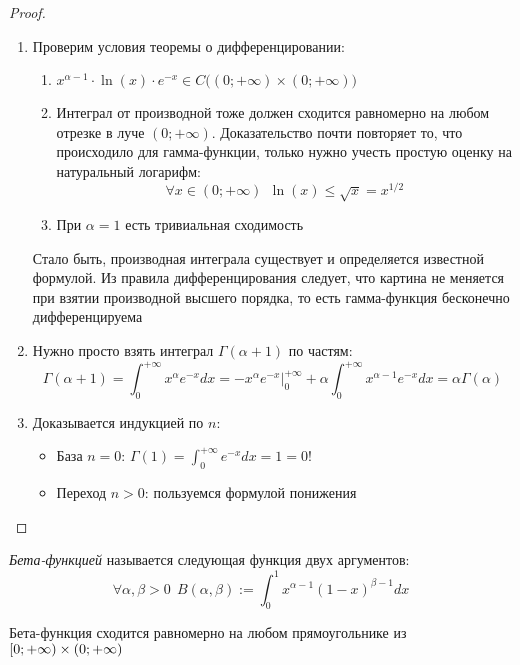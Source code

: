 \begin{proof}~
	\begin{enumerate}
		\item Проверим условия теоремы о дифференцировании:
		\begin{enumerate}
			\item $x^{\alpha - 1} \cdot \ln(x) \cdot e^{-x} \in C\big((0; +\infty) \times (0; +\infty)\big)$
			
			\item Интеграл от производной тоже должен сходится равномерно на любом отрезке в луче $(0; +\infty)$. Доказательство почти повторяет то, что происходило для гамма-функции, только нужно учесть простую оценку на натуральный логарифм:
			\[
				\forall x \in (0; +\infty)\ \ \ln(x) \le \sqrt{x} = x^{1 / 2}
			\]
			
			\item При $\alpha = 1$ есть тривиальная сходимость
		\end{enumerate}
		Стало быть, производная интеграла существует и определяется известной формулой. Из правила дифференцирования следует, что картина не меняется при взятии производной высшего порядка, то есть гамма-функция бесконечно дифференцируема
		
		\item Нужно просто взять интеграл $\Gamma(\alpha + 1)$ по частям:
		\[
			\Gamma(\alpha + 1) = \int_0^{+\infty} x^\alpha e^{-x}dx = -x^\alpha e^{-x}\Big|_0^{+\infty} + \alpha \int_0^{+\infty} x^{\alpha - 1}e^{-x}dx = \alpha\Gamma(\alpha)
		\]
		
		\item Доказывается индукцией по $n$:
		\begin{itemize}
			\item База $n = 0$: $\Gamma(1) = \int_0^{+\infty} e^{-x}dx = 1 = 0!$
			
			\item Переход $n > 0$: пользуемся формулой понижения
		\end{itemize}
	\end{enumerate}
\end{proof}

\begin{definition}
	\textit{Бета-функцией} называется следующая функция двух аргументов:
	\[
		\forall \alpha, \beta > 0\ \ B(\alpha, \beta) := \int_0^1 x^{\alpha - 1}(1 - x)^{\beta - 1}dx
	\]
\end{definition}

\begin{proposition}
	Бета-функция сходится равномерно на любом прямоугольнике из $\left[0; +\infty\right) \times (0; +\infty)$
\end{proposition}

